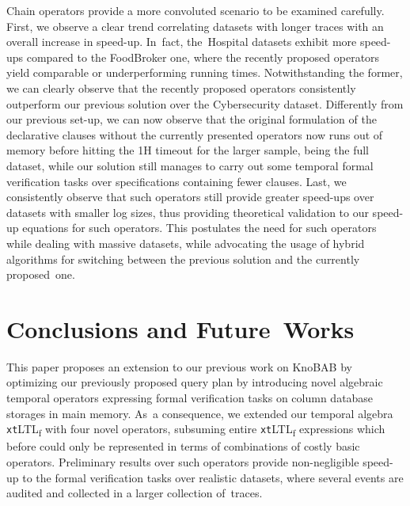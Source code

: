 \documentclass[information,article,accept,pdftex,oneauthor]{Definitions/mdpi}
\begin{document}
{Chain} operators provide a more convoluted scenario to be examined carefully. First, we observe a clear trend correlating datasets with longer traces with an overall increase in speed-up. In~fact, the~{Hospital} datasets exhibit more speed-ups compared to the {FoodBroker} one, where the recently proposed operators yield comparable or underperforming running times. Notwithstanding the former, we can clearly observe that the recently proposed operators consistently outperform our previous solution over the {Cybersecurity} dataset. Differently from our previous set-up, we can now observe that the original formulation of the declarative clauses without the currently presented operators now runs out of memory before hitting the 1H timeout for the larger sample, being the full dataset, while our solution still manages to carry out some temporal formal verification tasks over specifications containing fewer clauses. Last, we consistently observe that such operators still provide greater speed-ups over datasets with smaller log sizes, thus providing theoretical validation to our speed-up equations for such operators. This postulates the need for such operators while dealing with massive datasets, while advocating the usage of hybrid algorithms for switching between the previous solution and the currently proposed~one.



\section{Conclusions and Future~Works}
This paper proposes an extension to our previous work on KnoBAB by optimizing our previously proposed query plan by introducing novel algebraic temporal operators expressing formal verification tasks on column database storages in main memory. As~a consequence, we extended our temporal algebra \texttt{xt}LTL\textsubscript{f} with four novel operators, subsuming entire \texttt{xt}LTL\textsubscript{f} expressions which before could only be represented in terms of combinations of costly basic operators. %
Preliminary results over such operators provide non-negligible speed-up to the formal verification tasks over realistic datasets, where several events are audited and collected in a larger collection of~traces. 
\end{document}
